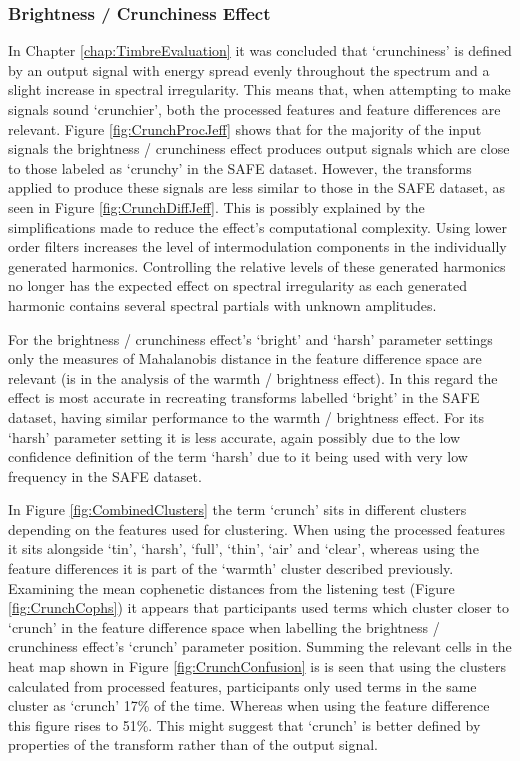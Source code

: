 		\subsubsection*{Brightness / Crunchiness Effect}
			In Chapter \ref{chap:TimbreEvaluation} it was concluded that `crunchiness' is defined by an output
			signal with energy spread evenly throughout the spectrum and a slight increase in spectral
			irregularity. This means that, when attempting to make signals sound `crunchier', both the
			processed features and feature differences are relevant.  Figure \ref{fig:CrunchProcJeff} shows
			that for the majority of the input signals the brightness / crunchiness effect produces output
			signals which are close to those labeled as `crunchy' in the SAFE dataset. However, the transforms
			applied to produce these signals are less similar to those in the SAFE dataset, as seen in Figure
			\ref{fig:CrunchDiffJeff}. This is possibly explained by the simplifications made to reduce the
			effect's computational complexity. Using lower order filters increases the level of intermodulation
			components in the individually generated harmonics. Controlling the relative levels of these
			generated harmonics no longer has the expected effect on spectral irregularity as each generated
			harmonic contains several spectral partials with unknown amplitudes.

			For the brightness / crunchiness effect's `bright' and `harsh' parameter settings only the measures
			of Mahalanobis distance in the feature difference space are relevant (is in the analysis of the
			warmth / brightness effect). In this regard the effect is most accurate in recreating transforms
			labelled `bright' in the SAFE dataset, having similar performance to the warmth / brightness
			effect.  For its `harsh' parameter setting it is less accurate, again possibly due to the low
			confidence definition of the term `harsh' due to it being used with very low frequency in the SAFE
			dataset.

			In Figure \ref{fig:CombinedClusters} the term `crunch' sits in different clusters depending on the
			features used for clustering. When using the processed features it sits alongside `tin', `harsh',
			`full', `thin', `air' and `clear', whereas using the feature differences it is part of the `warmth'
			cluster described previously. Examining the mean cophenetic distances from the listening test
			(Figure \ref{fig:CrunchCophs}) it appears that participants used terms which cluster closer to
			`crunch' in the feature difference space when labelling the brightness / crunchiness effect's
			`crunch' parameter position. Summing the relevant cells in the heat map shown in Figure
			\ref{fig:CrunchConfusion} is is seen that using the clusters calculated from processed features,
			participants only used terms in the same cluster as `crunch' 17\% of the time. Whereas when using
			the feature difference this figure rises to 51\%. This might suggest that `crunch' is better
			defined by properties of the transform rather than of the output signal.

